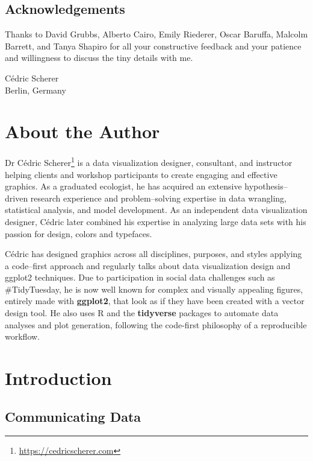 \documentclass[
]{krantz}
\renewcommand{\href}[2]{#2\footnote{\url{#1}}}
\begin{document}
\hypertarget{acknowledgements}{%
\section*{Acknowledgements}\label{acknowledgements}}


Thanks to David Grubbs, Alberto Cairo, Emily Riederer, Oscar Baruffa, Malcolm Barrett, and Tanya Shapiro for all your constructive feedback and your patience and willingness to discuss the tiny details with me.

\begin{flushright}
Cédric Scherer\\
Berlin, Germany
\end{flushright}

\hypertarget{about-the-author}{%
\chapter*{About the Author}\label{about-the-author}}


\href{https://cedricscherer.com}{Dr Cédric Scherer} is a data visualization designer, consultant, and instructor helping clients and workshop participants to create engaging and effective graphics. As a graduated ecologist, he has acquired an extensive hypothesis--driven research experience and problem--solving expertise in data wrangling, statistical analysis, and model development. As an independent data visualization designer, Cédric later combined his expertise in analyzing large data sets with his passion for design, colors and typefaces.

Cédric has designed graphics across all disciplines, purposes, and styles applying a code--first approach and regularly talks about data visualization design and ggplot2 techniques. Due to participation in social data challenges such as \#TidyTuesday, he is now well known for complex and visually appealing figures, entirely made with \textbf{ggplot2}, that look as if they have been created with a vector design tool. He also uses R and the \textbf{tidyverse} packages to automate data analyses and plot generation, following the code-first philosophy of a reproducible workflow.

\mainmatter

\hypertarget{introduction}{%
\chapter{Introduction}\label{introduction}}

\hypertarget{communication}{%
\section{Communicating Data}\label{communication}}
\end{document}
